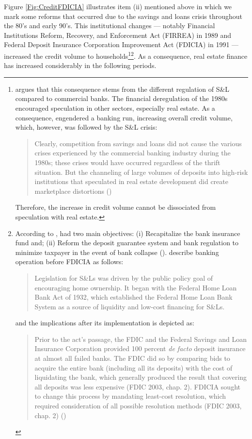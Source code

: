 Figure \ref{Fig:CreditFDICIA} illustrates item (ii) mentioned above in which we mark some reforms that occurred due to the savings and loans crisis throughout the 80's and early 90's.
This institutional changes --- notably Financial Institutions Reform, Recovery, and Enforcement Act (FIRREA) in 1989 and Federal Deposit Insurance Corporation Improvement Act  (FDICIA) in 1991 --- increased the credit volume to households\footnote{
	\textcite{federal_deposit_insurance_corporation_savings_1997} argues that this consequence stems from the different regulation of S\&L compared to commercial banks. The financial deregulation of the 1980s encouraged speculation in other sectors, especially real estate. As a consequence, engendered a banking run, increasing overall credit volume, which, however, was followed by the S\&L crisis:
	\begin{quotation}
		Clearly, competition from savings and loans did not cause the various crises experienced by the commercial banking industry during the 1980s; these crises would have occurred regardless of the thrift situation. But the channeling of large volumes of deposits into high-risk institutions that speculated in real estate development did create marketplace distortions (\cite[p.~168]{federal_deposit_insurance_corporation_savings_1997})
	\end{quotation}
	Therefore, the increase in credit volume cannot be dissociated from speculation with real estate.
}\footnote{
	According to \textcite{federal_deposit_insurance_corporation_savings_1997}, had two main objectives:
		(i) Recapitalize the bank insurance fund and;
		(ii) Reform the deposit guarantee system and bank regulation to minimize  taxpayer in the event of bank collapse (\cite{mishkin_evaluating_1997}).
		\textcite[p.~170]{federal_deposit_insurance_corporation_savings_1997} describe banking operation before FDICIA as follows:
		\begin{quotation}
			Legislation for S\&Ls was driven by the public policy goal of encouraging home ownership. It began with the Federal Home Loan Bank Act of 1932, which established the Federal Home Loan Bank System as a source of liquidity and low-cost financing for S\&Ls.
		\end{quotation}
	and the implications after its implementation is depicted as:
		\begin{quotation}
			Prior to the act’s passage, the FDIC and the Federal Savings and Loan Insurance Corporation provided 100 percent \textit{de facto} deposit insurance at almost all failed banks. The FDIC did so by comparing bids to acquire the entire bank (including all its deposits) with the cost of liquidating the bank, which generally produced the result that covering all deposits was less expensive (FDIC 2003, chap. 2). FDICIA sought to change this process by mandating least-cost resolution, which required consideration of all possible resolution methods (FDIC 2003, chap. 2) (\cite[p.~iii]{wall_too_2010})
		\end{quotation}
		
}. As a consequence, real estate finance has increased considerably in the following periods.

